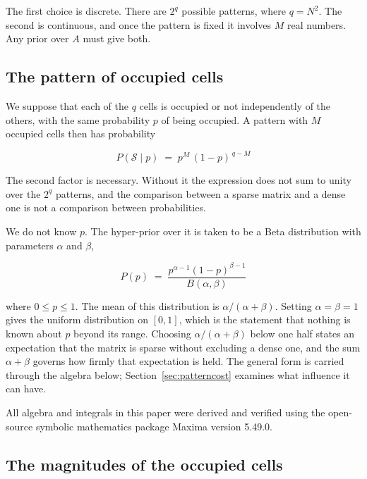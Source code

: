 The first choice is discrete. There are $2^{q}$ possible patterns, where $q = N^2$.
The second is continuous, and once the pattern is fixed it involves $M$ real numbers.
Any prior over $A$ must give both.

\subsection{The pattern of occupied cells}

We suppose that each of the $q$ cells is occupied or not independently of the others,
with the same probability $p$ of being occupied. A pattern with $M$ occupied cells
then has probability

\begin{equation}
P(\mathcal{S} \mid p) \;=\; p^{M} \, (1-p)^{\,q-M}
\label{eq:patternprior}
\end{equation}

The second factor is necessary. Without it the expression does not sum to unity over
the $2^{q}$ patterns, and the comparison between a sparse matrix and a dense one is
not a comparison between probabilities.

We do not know $p$. The hyper-prior over it is taken to be a Beta distribution with
parameters $\alpha$ and $\beta$,

\begin{equation}
P(p) \;=\; \frac{p^{\alpha-1} (1-p)^{\beta-1}}{B(\alpha,\beta)}
\label{eq:pprior}
\end{equation}

where $0 \le p \le 1$. The mean of this distribution is
$\alpha/(\alpha+\beta)$. Setting $\alpha = \beta = 1$ gives the uniform
distribution on $[0,1]$, which is the statement that nothing is known about $p$
beyond its range. Choosing $\alpha/(\alpha+\beta)$ below one half states an
expectation that the matrix is sparse without excluding a dense one, and the sum
$\alpha + \beta$ governs how firmly that expectation is held. The general form is
carried through the algebra below; Section~\ref{sec:patterncost} examines what
influence it can have.

All algebra and integrals in this paper were derived and verified using the open-source symbolic
mathematics package Maxima version 5.49.0.

\subsection{The magnitudes of the occupied cells}
\label{sec:magnitudes}

